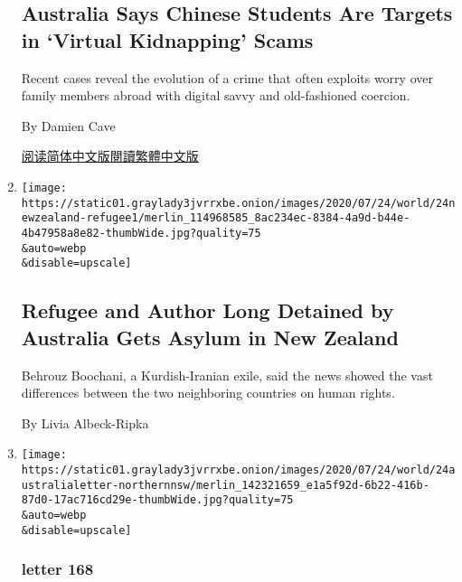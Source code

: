 \begin{enumerate}
  \hypertarget{australia-says-chinese-students-are-targets-in-virtual-kidnapping-scams}{%
  \subsection{Australia Says Chinese Students Are Targets in `Virtual
  Kidnapping'
  Scams}\label{australia-says-chinese-students-are-targets-in-virtual-kidnapping-scams}}

  Recent cases reveal the evolution of a crime that often exploits worry
  over family members abroad with digital savvy and old-fashioned
  coercion.

  By Damien Cave

  \href{https://cn.nytimes3xbfgragh.onion/asia-pacific/20200729/chinese-students-virtual-kidnapping/}{阅读简体中文版}\href{https://cn.nytimes3xbfgragh.onion/asia-pacific/20200729/chinese-students-virtual-kidnapping/zh-hant/}{閱讀繁體中文版}
\item
  \href{/2020/07/24/world/australia/behrouz-boochani-asylum-new-zealand.html}{}

  \texttt{[image: https://static01.graylady3jvrrxbe.onion/images/2020/07/24/world/24newzealand-refugee1/merlin\_114968585\_8ac234ec-8384-4a9d-b44e-4b47958a8e82-thumbWide.jpg?quality=75\\\&auto=webp\\\&disable=upscale]}

  \hypertarget{refugee-and-author-long-detained-by-australia-gets-asylum-in-new-zealand}{%
  \subsection{Refugee and Author Long Detained by Australia Gets Asylum
  in New
  Zealand}\label{refugee-and-author-long-detained-by-australia-gets-asylum-in-new-zealand}}

  Behrouz Boochani, a Kurdish-Iranian exile, said the news showed the
  vast differences between the two neighboring countries on human
  rights.

  By Livia Albeck-Ripka
\item
  \href{/2020/07/24/world/australia/divisions-decency-and-the-plague.html}{}

  \texttt{[image: https://static01.graylady3jvrrxbe.onion/images/2020/07/24/world/24australialetter-northernnsw/merlin\_142321659\_e1a5f92d-6b22-416b-87d0-17ac716cd29e-thumbWide.jpg?quality=75\\\&auto=webp\\\&disable=upscale]}

  \hypertarget{letter-168}{%
  \subsubsection{letter 168}\label{letter-168}}


\end{enumerate}

